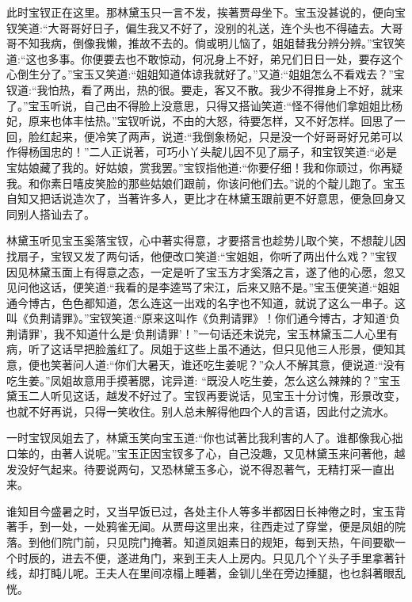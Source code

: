 \begin{parag}
    此时宝钗正在这里。那林黛玉只一言不发，挨著贾母坐下。宝玉没甚说的，便向宝钗笑道:“大哥哥好日子，偏生我又不好了，没别的礼送，连个头也不得磕去。大哥哥不知我病，倒像我懒，推故不去的。倘或明儿恼了，姐姐替我分辨分辨。”宝钗笑道:“这也多事。你便要去也不敢惊动，何况身上不好，弟兄们日日一处，要存这个心倒生分了。”宝玉又笑道:“姐姐知道体谅我就好了。”又道:“姐姐怎么不看戏去？”宝钗道:“我怕热，看了两出，热的很。要走，客又不散。我少不得推身上不好，就来了。”宝玉听说，自己由不得脸上没意思，只得又搭讪笑道:“怪不得他们拿姐姐比杨妃，原来也体丰怯热。”宝钗听说，不由的大怒，待要怎样，又不好怎样。回思了一回，脸红起来，便冷笑了两声，说道:“我倒象杨妃，只是没一个好哥哥好兄弟可以作得杨国忠的！”二人正说著，可巧小丫头靛儿因不见了扇子，和宝钗笑道:“必是宝姑娘藏了我的。好姑娘，赏我罢。”宝钗指他道:“你要仔细！我和你顽过，你再疑我。和你素日嘻皮笑脸的那些姑娘们跟前，你该问他们去。”说的个靛儿跑了。宝玉自知又把话说造次了，当著许多人，更比才在林黛玉跟前更不好意思，便急回身又同别人搭讪去了。
\end{parag}


\begin{parag}
    林黛玉听见宝玉奚落宝钗，心中著实得意，才要搭言也趁势儿取个笑，不想靛儿因找扇子，宝钗又发了两句话，他便改口笑道:“宝姐姐，你听了两出什么戏？”宝钗因见林黛玉面上有得意之态，一定是听了宝玉方才奚落之言，遂了他的心愿，忽又见问他这话，便笑道:“我看的是李逵骂了宋江，后来又赔不是。”宝玉便笑道:“姐姐通今博古，色色都知道，怎么连这一出戏的名字也不知道，就说了这么一串子。这叫《负荆请罪》。”宝钗笑道:“原来这叫作《负荆请罪》！你们通今博古，才知道‘负荆请罪’，我不知道什么是‘负荆请罪’！”一句话还未说完，宝玉林黛玉二人心里有病，听了这话早把脸羞红了。凤姐于这些上虽不通达，但只见他三人形景，便知其意，便也笑著问人道:“你们大暑天，谁还吃生姜呢？”众人不解其意，便说道:“没有吃生姜。”凤姐故意用手摸著腮，诧异道: “既没人吃生姜，怎么这么辣辣的？”宝玉黛玉二人听见这话，越发不好过了。宝钗再要说话，见宝玉十分讨愧，形景改变，也就不好再说，只得一笑收住。别人总未解得他四个人的言语，因此付之流水。
\end{parag}


\begin{parag}
    一时宝钗凤姐去了，林黛玉笑向宝玉道:“你也试著比我利害的人了。谁都像我心拙口笨的，由著人说呢。”宝玉正因宝钗多了心，自己没趣，又见林黛玉来问著他，越发没好气起来。待要说两句，又恐林黛玉多心，说不得忍著气，无精打采一直出来。
\end{parag}


\begin{parag}
    谁知目今盛暑之时，又当早饭已过，各处主仆人等多半都因日长神倦之时，宝玉背著手，到一处，一处鸦雀无闻。从贾母这里出来，往西走过了穿堂，便是凤姐的院落。到他们院门前，只见院门掩著。知道凤姐素日的规矩，每到天热，午间要歇一个时辰的，进去不便，遂进角门，来到王夫人上房内。只见几个丫头子手里拿著针线，却打盹儿呢。王夫人在里间凉榻上睡著，金钏儿坐在旁边捶腿，也乜斜著眼乱恍。
\end{parag}


